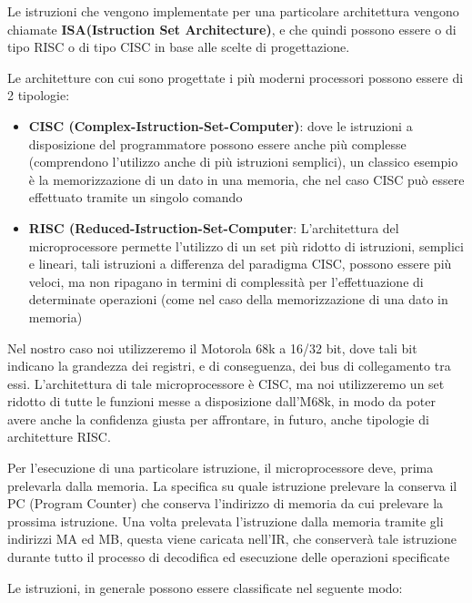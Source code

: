 Le istruzioni che vengono implementate per una particolare architettura vengono chiamate \textbf{ISA(Istruction Set Architecture)}, e che quindi possono essere o di tipo RISC o di tipo CISC in base alle scelte di progettazione.

Le architetture con cui sono progettate i più moderni processori possono essere di 2 tipologie:
\begin{itemize}
    \item \textbf{CISC (Complex-Istruction-Set-Computer)}: dove le istruzioni a disposizione del programmatore possono essere anche più complesse (comprendono l'utilizzo anche di più istruzioni semplici), un classico esempio è la memorizzazione di un dato in una memoria, che nel caso CISC può essere effettuato tramite un singolo comando

    \item \textbf{RISC (Reduced-Istruction-Set-Computer}: L'architettura del microprocessore permette l'utilizzo di un set più ridotto di istruzioni, semplici e lineari, tali istruzioni a differenza del paradigma CISC, possono essere più veloci, ma non ripagano in termini di complessità per l'effettuazione di determinate operazioni (come nel caso della memorizzazione di una dato in memoria)
\end{itemize}

Nel nostro caso noi utilizzeremo il Motorola 68k a 16/32 bit, dove tali bit indicano la grandezza dei registri, e di conseguenza, dei bus di collegamento tra essi. L'architettura di tale microprocessore è CISC, ma noi utilizzeremo un set ridotto di tutte le funzioni messe a disposizione dall'M68k, in modo da poter avere anche la confidenza giusta per affrontare, in futuro, anche tipologie di architetture RISC.

Per l'esecuzione di una particolare istruzione, il microprocessore deve, prima prelevarla dalla memoria. La specifica su quale istruzione prelevare la conserva il PC (Program Counter) che conserva l'indirizzo di memoria da cui prelevare la prossima istruzione. Una volta prelevata l'istruzione dalla memoria tramite gli indirizzi MA ed MB, questa viene caricata nell'IR, che conserverà tale istruzione durante tutto il processo di decodifica ed esecuzione delle operazioni specificate

Le istruzioni, in generale possono essere classificate nel seguente modo:

